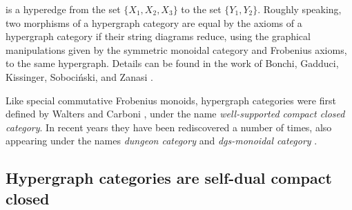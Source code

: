 is a hyperedge from the set $\{X_1,X_2,X_3\}$ to the set $\{Y_1,Y_2\}$. Roughly
speaking, two morphisms of a hypergraph category are equal by the axioms of a
hypergraph category if their string diagrams reduce, using the graphical
manipulations given by the symmetric monoidal category and Frobenius axioms, to
the same hypergraph. Details can be found in the work of Bonchi, Gadduci,
Kissinger, Soboci\'nski, and Zanasi \cite{BGKSZ}.

Like special commutative Frobenius monoids, hypergraph categories were first
defined by Walters and Carboni \cite{Car91}, under the name \emph{well-supported
compact closed category}. In recent years they have been rediscovered a number
of times, also appearing under the names \emph{dungeon category} \cite{Mor14}
and \emph{dgs-monoidal category} \cite{GH98}. 




\subsection{Hypergraph categories are self-dual compact closed}

